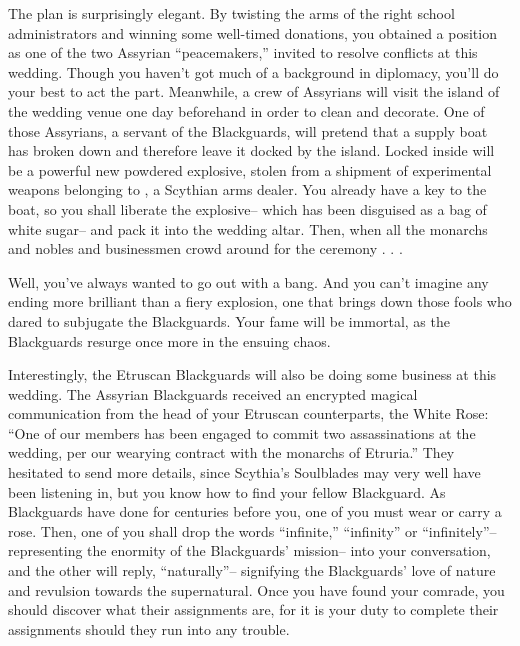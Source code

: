 \documentclass[char]{Kos}
\begin{document}
The plan is surprisingly elegant. By twisting the arms of the right school administrators and winning some well-timed donations, you obtained a position as one of the two Assyrian “peacemakers,” invited to resolve conflicts at this wedding. Though you haven’t got much of a background in diplomacy, you’ll do your best to act the part. Meanwhile, a crew of Assyrians will visit the island of the wedding venue one day beforehand in order to clean and decorate. One of those Assyrians, a servant of the Blackguards, will pretend that a supply boat has broken down and therefore leave it docked by the island. Locked inside will be a powerful new powdered explosive, stolen from a shipment of experimental weapons belonging to \cArmsDealer{\name}, a Scythian arms dealer. You already have a key to the boat, so you shall liberate the explosive-- which has been disguised as a bag of white sugar-- and pack it into the wedding altar. Then, when all the monarchs and nobles and businessmen crowd around for the ceremony . . .

Well, you’ve always wanted to go out with a bang. And you can’t imagine any ending more brilliant than a fiery explosion, one that brings down those fools who dared to subjugate the Blackguards. Your fame will be immortal, as the Blackguards resurge once more in the ensuing chaos.

Interestingly, the Etruscan Blackguards will also be doing some business at this wedding. The Assyrian Blackguards received an encrypted magical communication from the head of your Etruscan counterparts, the White Rose: “One of our members has been engaged to commit two assassinations at the wedding, per our wearying contract with the monarchs of Etruria.” They hesitated to send more details, since Scythia’s Soulblades may very well have been listening in, but you know how to find your fellow Blackguard. As Blackguards have done for centuries before you, one of you must wear or carry a rose. Then, one of you shall drop the words “infinite,” “infinity” or “infinitely”-- representing the enormity of the Blackguards’ mission-- into your conversation, and the other will reply, “naturally”-- signifying the Blackguards’ love of nature and revulsion towards the supernatural. Once you have found your comrade, you should discover what their assignments are, for it is your duty to complete their assignments should they run into any trouble.
\end{document}
